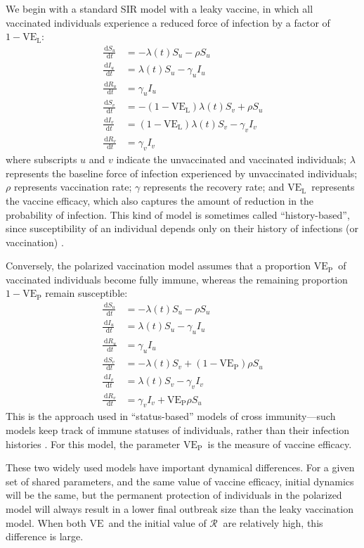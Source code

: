 \documentclass[12pt]{article}
\newcommand{\Rx}[1]{\ensuremath{{\mathcal R}_{#1}}\xspace}
\newcommand{\dd}[1]{\ensuremath{\, \mathrm{d}#1}}
\newcommand{\VE}{\ensuremath{\mathrm{VE}}}
\newcommand{\VEP}{\ensuremath{\VE_{\mathrm{P}}}}
\newcommand{\VEL}{\ensuremath{\VE_{\mathrm{L}}}}
\begin{document}
We begin with a standard SIR model with a leaky vaccine, in which all vaccinated individuals experience a reduced force of infection by a factor of $1-\VEL$:
\begin{align}
\frac{\dd S_u}{\dd t} &= - \lambda(t) S_u - \rho S_u \\
\frac{\dd I_u}{\dd t} &= \lambda(t) S_u - \gamma_u I_u \\
\frac{\dd R_u}{\dd t} &= \gamma_u I_u \\
\frac{\dd S_v}{\dd t} &= - (1-\VEL) \lambda(t) S_v + \rho S_u \\
\frac{\dd I_v}{\dd t} &= (1-\VEL) \lambda(t) S_v - \gamma_v I_v \\
\frac{\dd R_v}{\dd t} &= \gamma_v I_v
\end{align}
where subscripts $u$ and $v$ indicate the unvaccinated and vaccinated individuals;
$\lambda$ represents the baseline force of infection experienced by unvaccinated individuals; 
$\rho$ represents vaccination rate;
$\gamma$ represents the recovery rate;
and \VEL\ represents the vaccine efficacy, which also captures the amount of reduction in the probability of infection.
This kind of model is sometimes called “history-based”, since susceptibility of an individual depends only on their history of infections (or vaccination) \citep{gog2002dynamics,gog2002status,kucharski2016capturing}.

Conversely, the polarized vaccination model assumes that a proportion \VEP\ of vaccinated individuals become fully immune, whereas the remaining proportion $1-\VEP$ remain susceptible: 
\begin{align}
\frac{\dd S_u}{\dd t} &= - \lambda(t) S_u - \rho S_u \\
\frac{\dd I_u}{\dd t} &= \lambda(t) S_u - \gamma_u I_u \\
\frac{\dd R_u}{\dd t} &= \gamma_u I_u \\
\frac{\dd S_v}{\dd t} &= - \lambda(t) S_v + (1-\VEP) \rho S_u \\
\frac{\dd I_v}{\dd t} &= \lambda(t) S_v - \gamma_v I_v \\
\frac{\dd R_v}{\dd t} &= \gamma_v I_v + \VEP \rho S_u
\end{align}
This is the approach used in “status-based” models of cross immunity---such models keep track of immune statuses of individuals, rather than their infection histories \citep{gog2002dynamics,gog2002status,kucharski2016capturing}.
For this model, the parameter \VEP\ is the measure of vaccine efficacy.

These two widely used models have important dynamical differences. For a given set of shared parameters, and the same value of vaccine efficacy, initial dynamics will be the same, but the permanent protection of individuals in the polarized model will always result in a lower final outbreak size than the leaky vaccination model. When both \VE\ and the initial value of \Rx\ are relatively high, this difference is large.
\end{document}
